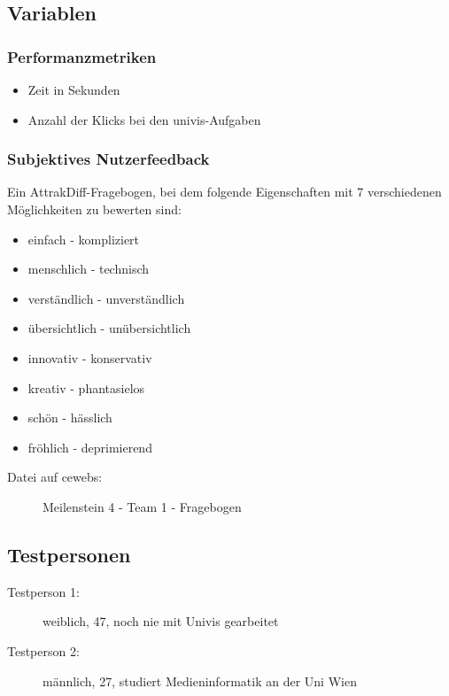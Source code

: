 \documentclass[a4paper,10pt]{scrartcl}
\begin{document}
\subsection{Variablen}

\subsubsection{Performanzmetriken}

\begin{itemize}
 \item Zeit in Sekunden
 \item Anzahl der Klicks bei den univis-Aufgaben
\end{itemize}

\subsubsection{Subjektives Nutzerfeedback}

Ein AttrakDiff-Fragebogen, bei dem folgende Eigenschaften mit 7 verschiedenen Möglichkeiten zu bewerten sind:

\begin{itemize}
\item einfach - kompliziert 
\item menschlich - technisch
\item verständlich - unverständlich
\item übersichtlich - unübersichtlich 
\item innovativ - konservativ
\item kreativ - phantasielos
\item schön - hässlich
\item fröhlich - deprimierend 
\end{itemize}

\begin{description}
 \item[Datei auf cewebs:]Meilenstein 4 - Team 1 - Fragebogen
\end{description}

\subsection{Testpersonen}

\begin{description}
 \item[Testperson 1:] weiblich, 47, noch nie mit Univis gearbeitet
 \item[Testperson 2:] männlich, 27, studiert Medieninformatik an der Uni Wien
\end{description}
\end{document}

